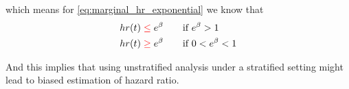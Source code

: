 \documentclass[a4paper,12pt]{article}
\begin{document}
which means for \eqref{eq:marginal_hr_exponential} we know that
\[
  \begin{aligned}
    hr(t) & {\color{red}\;\leq\;} e^\beta
    && \quad \text{if } e^\beta > 1    \\
        hr(t) & {\color{red}\;\geq\;} e^\beta
    && \quad \text{if } 0 < e^\beta < 1    \\
  \end{aligned}
\]
\par
And this implies that using unstratified analysis under a stratified setting might lead to {\color{red} biased} estimation of hazard ratio. 



\end{document}
